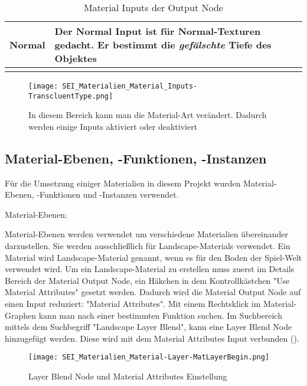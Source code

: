 {\begin{longtable}{|p{4cm}|p{9.6cm}|}
Normal & Der Normal Input ist für Normal-Texturen gedacht. Er bestimmt die \textit{gefälschte} Tiefe des Objektes \\
\hline

\caption{Material Inputs der Output Node}
\label{table:mat_inputs}
\end{longtable}

\begin{figure}[H]
\centering
\texttt{[image: SEI\_Materialien\_Material\_Inputs-TranscluentType.png]}
\caption{In diesem Bereich kann man die Material-Art verändert. Dadurch werden einige Inputs aktiviert oder deaktiviert}
\label{picture:translucent}
\end{figure}


\subsection{Material-Ebenen, -Funktionen, -Instanzen}
\label{sec:mat_lay_func_ins}

Für die Umsetzung einiger Materialien in diesem Projekt wurden Material-Ebenen, -Funktionen und -Instanzen verwendet.

Material-Ebenen\citep{ue:mat_landscape}:

Material-Ebenen werden verwendet um verschiedene Materialien übereinander darzustellen. Sie werden ausschließlich für
Landscape-Materials verwendet. Ein Material wird Landscape-Material genannt, wenn es für den Boden der Spiel-Welt
verwendet wird. Um ein Landscape-Material zu erstellen muss zuerst im Details Bereich der Material Output Node, ein
Häkchen in dem Kontrollkästchen "Use Material Attributes" gesetzt werden. Dadurch wird die Material Output Node auf
einen Input reduziert: "Material Attributes". Mit einem Rechtsklick im Material-Graphen kann man nach einer bestimmten
Funktion suchen. Im Suchbereich mittels dem Suchbegriff "Landscape Layer Blend", kann eine Layer Blend Node hinzugefügt
werden. Diese wird mit dem Material Attributes Input verbunden ().

\begin{figure}[H]
\centering
\texttt{[image: SEI\_Materialien\_Material-Layer-MatLayerBegin.png]}
\caption{Layer Blend Node und Material Attributes Einstellung}
\label{picture:layer_blend}
\end{figure}

}
